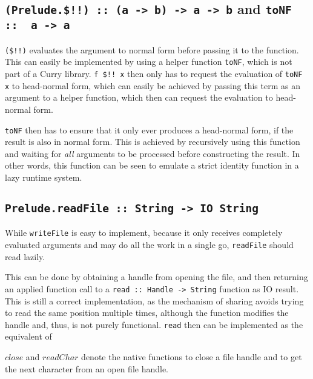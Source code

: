 \subsection{\texttt{(Prelude.\$!!) ::~(a -> b) -> a -> b} and \texttt{toNF :: ~a -> a}}

\texttt{(\$!!)} evaluates the argument to normal form before passing it to the function.
This can easily be implemented by using a helper function \texttt{toNF}, which is not part of a Curry library.
\texttt{f \$!!~x} then only has to request the evaluation of \texttt{toNF x} to head-normal form, which can easily be achieved by passing this term as an argument to a helper function, which then can request the evaluation to head-normal form.

\texttt{toNF} then has to ensure that it only ever produces a head-normal form, if the result is also in normal form.
This is achieved by recursively using this function and waiting for \emph{all} arguments to be processed before constructing the result.
In other words, this function can be seen to emulate a strict identity function in a lazy runtime system.

\subsection{\texttt{Prelude.readFile ::~String -> IO String}}

While \texttt{writeFile} is easy to implement, because it only receives completely evaluated arguments and may do all the work in a single go, \texttt{readFile} should read lazily.

This can be done by obtaining a handle from opening the file, and then returning an applied function call to a \texttt{read :: Handle -> String} function as IO result.
This is still a correct implementation, as the mechanism of sharing avoids trying to read the same position multiple times, although the function modifies the handle and, thus, is not purely functional.
\texttt{read} then can be implemented as the equivalent of

\begin{algorithm}[H]
\end{algorithm}

\noindent
$close$ and $readChar$ denote the native functions to close a file handle and to get the next character from an open file handle.

